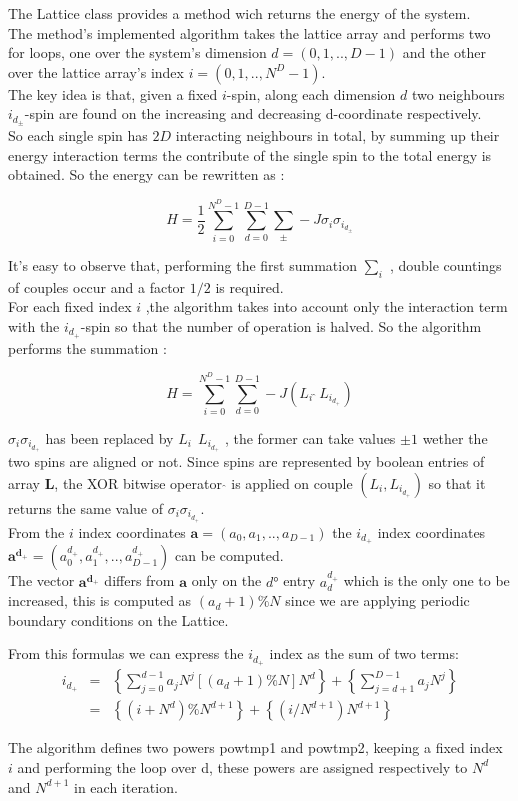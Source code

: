 \documentclass[11]{article}
\begin{document}
The Lattice class provides a method wich returns the energy of the system. \\
The method's implemented algorithm takes the lattice array and performs two for loops, one over the system's dimension $d = (0,1,..,D-1)$ and the other over the lattice array's index $i = (0,1,..,N^D-1)$. \\
The key idea is that, given a fixed $i$-spin, along each dimension $d$ two neighbours $i_{d_\pm}$-spin are found on the increasing and decreasing d-coordinate respectively. 
\\So each single spin has $2D$ interacting neighbours in total, by summing up their energy interaction terms the contribute of the single spin to the total energy is obtained. So the energy can be rewritten as : 

$$H = \frac{1}{2}\sum_{i=0}^{N^D-1}\sum_{d=0}^{D-1}\sum_{\pm}^{} -J\sigma_i\sigma_{i_{d_\pm}}$$ 

It's easy to observe that, performing the first summation $\sum_{i}^{}$ , double countings of couples occur and a factor $1/2$ is required. \\ 
For each fixed index $i$ ,the algorithm takes into account only the interaction term with the 
$i_{d_+}$-spin so that the number of operation is halved. So the algorithm performs the summation :
  
$$H = \sum_{i=0}^{N^D-1}\sum_{d=0}^{D-1}-J(L_i \ \hat{} \ L_{i_{d_+}})$$ 

$\sigma_i\sigma_{i_{d_+}}$ has been replaced by $L_i \ \hat{} \ L_{i_{d_+}}$ , the former can take values $\pm1$ wether the two spins are aligned or not. Since spins are represented by boolean entries of array $\mathbf{L}$, the XOR bitwise operator $\hat{}$ is applied on couple $(L_i,L_{i_{d_+}})$ so that it returns the same value of $\sigma_i\sigma_{i_{d_+}}$. \\   
\vspace{0.1cm}
From the $i$ index coordinates $\mathbf{a} = (a_0,a_1,..,a_{D-1})$ the $i_{d_+}$ index coordinates 
$\mathbf{a^{d_+}} = (a^{d_+}_0,a^{d_+}_1,..,a^{d_+}_{D-1})$ can be computed. \\
The vector $\mathbf{a^{d_+}}$ differs from $\mathbf{a}$
only on the $d°$ entry $a^{d_+}_d$ which is the only one to be increased, this is computed as $(a_d+1)\%N$ since we are applying periodic boundary conditions on the Lattice. 

From this formulas we can express the $i_{d_+}$ index as the sum of two terms:
\begin{eqnarray*}
i_{d_+} &=& \left\{ \sum_{j = 0}^{d-1}a_jN^j  [(a_d + 1)\%N]N^d \right\} + \left\{ \sum_{j = d+1}^{D-1}a_jN^j \right\}  \\
&=& \left\{(i + N^d)\%N^{d+1} \right\}  +  \left\{ (i/N^{d+1})N^{d+1}  \right\} 
\end{eqnarray*}

The algorithm defines two powers \textsf{pow\textunderscore tmp1} and \textsf{pow\textunderscore tmp2}, keeping a fixed index $i$ and performing the loop over d, these powers are assigned respectively to $N^d$ and $N^{d+1}$ in each iteration. 

 


 
\end{document}
